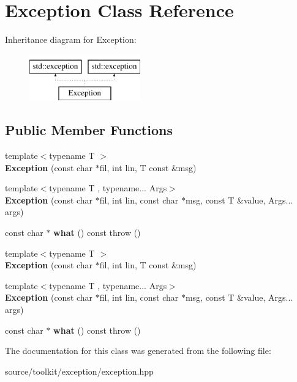 \hypertarget{classException}{}\section{Exception Class Reference}
\label{classException}
Inheritance diagram for Exception\+:\begin{figure}[H]
\begin{center}
\leavevmode
\includegraphics[height=2.000000cm]{classException}
\end{center}
\end{figure}
\subsection*{Public Member Functions}
\begin{DoxyCompactItemize}
\item 
\mbox{\label{classException_afed32696646800f73466d765b785cf3c}} 
{\footnotesize template$<$typename T $>$ }\\{\bfseries Exception} (const char $\ast$fil, int lin, T const \&msg)
\item 
\mbox{\label{classException_a8be0f3d62682991241ae7a097d73f8fe}} 
{\footnotesize template$<$typename T , typename... Args$>$ }\\{\bfseries Exception} (const char $\ast$fil, int lin, const char $\ast$msg, const T \&value, Args... args)
\item 
\mbox{\label{classException_add710fe2bae3ac497ed60393eea35c91}} 
const char $\ast$ {\bfseries what} () const  throw ()
\item 
\mbox{\label{classException_afed32696646800f73466d765b785cf3c}} 
{\footnotesize template$<$typename T $>$ }\\{\bfseries Exception} (const char $\ast$fil, int lin, T const \&msg)
\item 
\mbox{\label{classException_a8be0f3d62682991241ae7a097d73f8fe}} 
{\footnotesize template$<$typename T , typename... Args$>$ }\\{\bfseries Exception} (const char $\ast$fil, int lin, const char $\ast$msg, const T \&value, Args... args)
\item 
\mbox{\label{classException_add710fe2bae3ac497ed60393eea35c91}} 
const char $\ast$ {\bfseries what} () const  throw ()
\end{DoxyCompactItemize}


The documentation for this class was generated from the following file\+:\begin{DoxyCompactItemize}
\item 
source/toolkit/exception/exception.\+hpp\end{DoxyCompactItemize}
